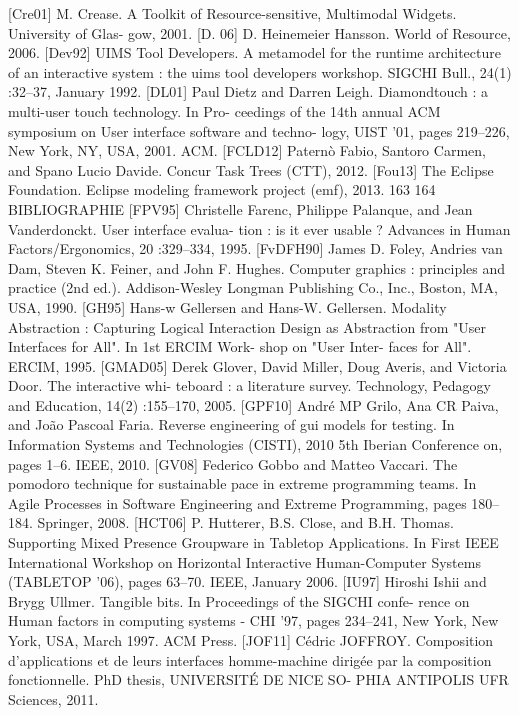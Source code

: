 \documentclass{article}
\begin{document}
[Cre01]
M. Crease. A Toolkit of Resource-sensitive, Multimodal Widgets. University of Glas-
gow, 2001.
[D. 06]
D. Heinemeier Hansson. World of Resource, 2006.
[Dev92]
UIMS Tool Developers. A metamodel for the runtime architecture of an interactive
system : the uims tool developers workshop. SIGCHI Bull., 24(1) :32–37, January
1992.
[DL01]
Paul Dietz and Darren Leigh. Diamondtouch : a multi-user touch technology. In Pro-
ceedings of the 14th annual ACM symposium on User interface software and techno-
logy, UIST ’01, pages 219–226, New York, NY, USA, 2001. ACM.
[FCLD12]
Paternò Fabio, Santoro Carmen, and Spano Lucio Davide. Concur Task Trees (CTT),
2012.
[Fou13]
The Eclipse Foundation. Eclipse modeling framework project (emf), 2013.
163
164
BIBLIOGRAPHIE
[FPV95]
Christelle Farenc, Philippe Palanque, and Jean Vanderdonckt. User interface evalua-
tion : is it ever usable ? Advances in Human Factors/Ergonomics, 20 :329–334, 1995.
[FvDFH90]
James D. Foley, Andries van Dam, Steven K. Feiner, and John F. Hughes. Computer
graphics : principles and practice (2nd ed.). Addison-Wesley Longman Publishing
Co., Inc., Boston, MA, USA, 1990.
[GH95]
Hans-w Gellersen and Hans-W. Gellersen. Modality Abstraction : Capturing Logical
Interaction Design as Abstraction from "User Interfaces for All". In 1st ERCIM Work-
shop on "User Inter- faces for All". ERCIM, 1995.
[GMAD05]
Derek Glover, David Miller, Doug Averis, and Victoria Door. The interactive whi-
teboard : a literature survey. Technology, Pedagogy and Education, 14(2) :155–170,
2005.
[GPF10]
André MP Grilo, Ana CR Paiva, and João Pascoal Faria. Reverse engineering of gui
models for testing. In Information Systems and Technologies (CISTI), 2010 5th Iberian
Conference on, pages 1–6. IEEE, 2010.
[GV08]
Federico Gobbo and Matteo Vaccari. The pomodoro technique for sustainable pace in
extreme programming teams. In Agile Processes in Software Engineering and Extreme
Programming, pages 180–184. Springer, 2008.
[HCT06]
P. Hutterer, B.S. Close, and B.H. Thomas. Supporting Mixed Presence Groupware in
Tabletop Applications. In First IEEE International Workshop on Horizontal Interactive
Human-Computer Systems (TABLETOP ’06), pages 63–70. IEEE, January 2006.
[IU97]
Hiroshi Ishii and Brygg Ullmer. Tangible bits. In Proceedings of the SIGCHI confe-
rence on Human factors in computing systems - CHI ’97, pages 234–241, New York,
New York, USA, March 1997. ACM Press.
[JOF11]
Cédric JOFFROY. Composition d’applications et de leurs interfaces homme-machine
dirigée par la composition fonctionnelle. PhD thesis, UNIVERSITÉ DE NICE SO-
PHIA ANTIPOLIS UFR Sciences, 2011.
\end{document}
